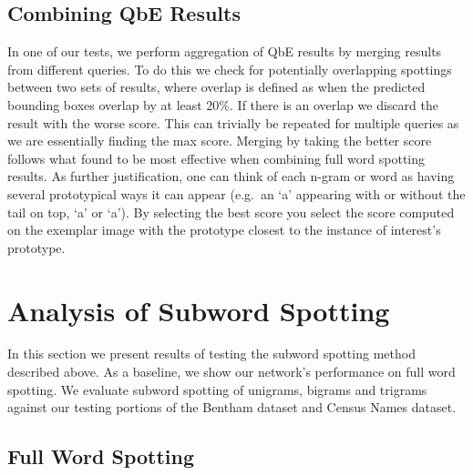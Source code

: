 \documentclass[ms,electronic,twosidetoc,letterpaper,chaptercenter,parttop,lof,lot]{byumsphd}
\begin{document}

\subsection{Combining QbE Results}\label{combine}

In one of our tests, we perform aggregation of QbE results by merging results from different queries. To do this we check for potentially overlapping spottings between two sets of results, where overlap is defined as when the predicted bounding boxes overlap by at least 20\%. If there is an overlap we discard the result with the worse score. This can trivially be repeated for multiple queries as we are essentially finding the max score. Merging by taking the better score follows what \cite{Zagoris2015} found to be most effective when combining full word spotting results. As further justification, one can think of each n-gram or word as having several prototypical ways it can appear (e.g.~an `a' appearing with or without the tail on top, `\textsf{a}' or `{\selectfont\footnotesize a}'). By selecting the best score you select the score computed on the exemplar image with the prototype closest to the instance of interest's prototype.



\section{Analysis of Subword Spotting}

In this section we present results of testing the subword spotting method described above.
As a baseline, we show our network's performance on full word spotting. We evaluate subword spotting of unigrams, bigrams and trigrams against our testing portions of the Bentham dataset and Census Names dataset. 

\subsection{Full Word Spotting}
\end{document}
